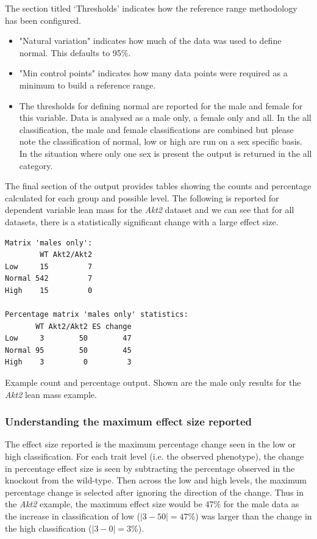 \documentclass[12pt,a4paper]{article}
\begin{document}
The section titled ‘Thresholds’ indicates how the reference range methodology has been configured.  
\begin{itemize}
\item "Natural variation" indicates how much of the data was used to define normal.  This defaults to 95\%. 
\item "Min control points" indicates how many data points were required as a minimum to build a reference range.  
\item The thresholds for defining normal are reported for the male and female for this variable.  Data is analysed as a male only, a female only and all.  In the all classification, the male and female classifications are combined but please note the classification of normal, low or high are run on a sex specific basis.  In the situation where only one sex is present the output is returned in the all category. 
\end{itemize}

The final section of the output provides tables showing the counts and percentage calculated for each group and possible level. The following is reported for dependent variable lean mass for the \textit{Akt2} dataset and we can see that for all datasets, there is a statistically significant change with a large effect size.


\begingroup
    \fontsize{8pt}{12pt}\selectfont
\begin{verbatim}
Matrix 'males only':
        WT Akt2/Akt2
Low     15         7
Normal 542         7
High    15         0

Percentage matrix 'males only' statistics:
       WT Akt2/Akt2 ES change
Low     3        50        47
Normal 95        50        45
High    3         0         3
\end{verbatim}
\endgroup 
Example count and percentage output.  Shown are the male only results for the \textit{Akt2} lean mass example.
\subsubsection{Understanding the maximum effect size reported}
The effect size reported is the maximum percentage change seen in the low or high classification. For each trait level (i.e. the observed phenotype), the change in percentage effect size is seen by subtracting the percentage observed in the knockout from the wild-type. Then across the low and high levels, the maximum percentage change is selected after ignoring the direction of the change. Thus in the \textit{Akt2} example, the maximum effect size would be 47\% for the male data as the increase in classification of low ($|3-50|=47$\%) was larger than the change in the high classification ($|3-0|=3$\%). 
\end{document}
